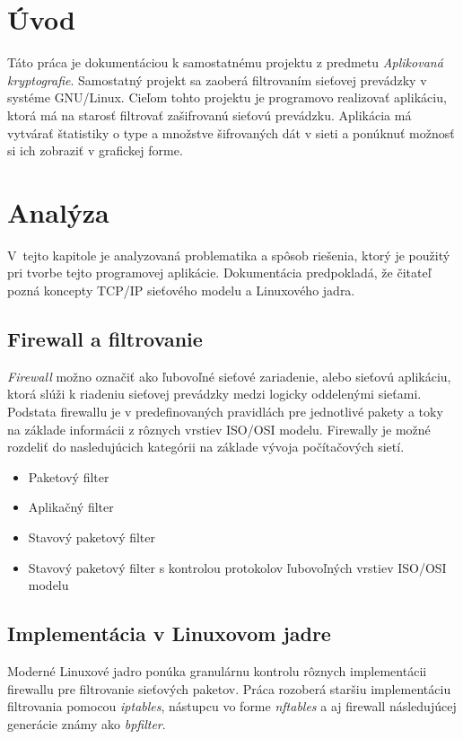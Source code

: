 
\chapter{Úvod}
Táto práca je dokumentáciou k samostatnému projektu z predmetu \emph{Aplikovaná kryptografie}. Samostatný projekt sa zaoberá filtrovaním sieťovej prevádzky v systéme GNU/Linux. Cieľom tohto projektu je programovo realizovať aplikáciu, ktorá má na starosť filtrovať zašifrovanú sieťovú prevádzku. Aplikácia má vytvárať štatistiky o type a množstve šifrovaných dát v sieti a ponúknuť možnosť si ich zobraziť v grafickej forme. 

\chapter{Analýza}
V~tejto kapitole je analyzovaná problematika a spôsob riešenia, ktorý je použitý pri tvorbe tejto programovej aplikácie. Dokumentácia predpokladá, že čitateľ pozná koncepty TCP/IP sieťového modelu a Linuxového jadra.

\section{Firewall a filtrovanie}
\emph{Firewall} možno označiť ako ľubovoľné sieťové zariadenie, alebo sieťovú aplikáciu, ktorá slúži k riadeniu sieťovej prevádzky medzi logicky oddelenými sieťami. Podstata firewallu je v predefinovaných pravidlách pre jednotlivé pakety a toky na základe informácii z rôznych vrstiev ISO/OSI modelu. Firewally je možné rozdeliť do nasledujúcich kategórii na základe vývoja počítačových sietí. 

\begin{itemize}
	\itemsep0em 
	\item Paketový filter
	\item Aplikačný filter
	\item Stavový paketový filter
	\item Stavový paketový filter s kontrolou protokolov ľubovoľných vrstiev ISO/OSI modelu
\end{itemize}



\section{Implementácia v Linuxovom jadre}
Moderné Linuxové jadro ponúka granulárnu kontrolu rôznych implementácii firewallu pre filtrovanie sieťových paketov. Práca rozoberá staršiu implementáciu filtrovania pomocou \emph{iptables}, nástupcu vo forme \emph{nftables} a aj firewall následujúcej generácie známy ako \emph{bpfilter}.

